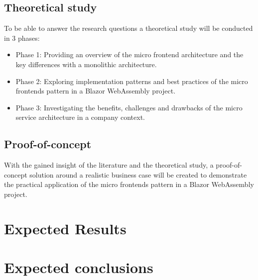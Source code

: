 \subsection{Theoretical study}
To be able to answer the research questions a theoretical study will be
conducted in 3 phases:
\begin{itemize}
    \item Phase 1: Providing an overview of the micro frontend architecture and
    the key differences with a monolithic architecture.
    \item Phase 2: Exploring implementation patterns and best practices of the
    micro frontends pattern  in a Blazor WebAssembly project.
    \item Phase 3: Investigating the benefits, challenges and drawbacks of the
    micro service architecture in a company context.
\end{itemize}

\subsection{Proof-of-concept}
With the gained insight of the literature and the theoretical study, a
proof-of-concept solution around a realistic business case will be created to
demonstrate the practical application of the micro frontends pattern in a Blazor
WebAssembly project.


\section{Expected Results}
\label{sec:expected-results}



\section{Expected conclusions}
\label{sec:expected-conclusions}


